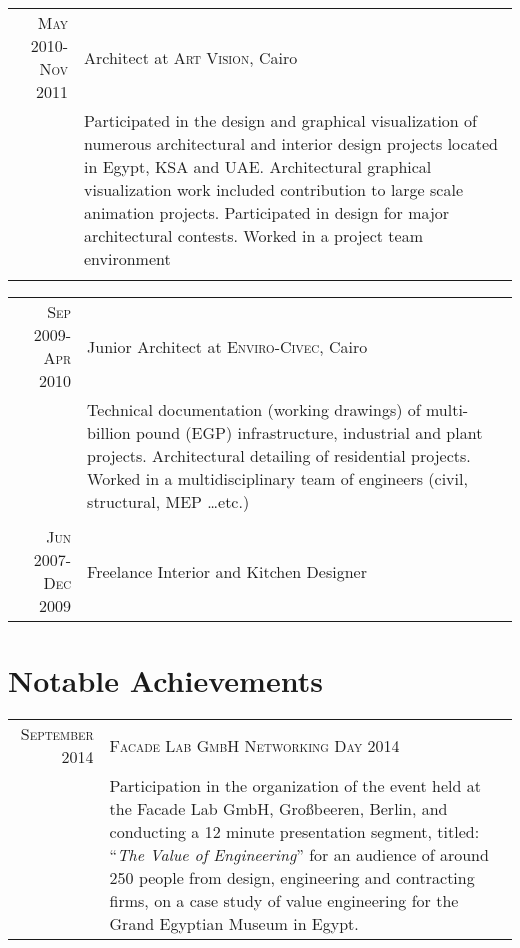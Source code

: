 \documentclass[a4paper,11pt]{article} %
\begin{document}
\begin{tabular}{r|p{11cm}}

\textsc{May 2010-Nov 2011} & Architect at \textsc{Art Vision}, Cairo \emph{}\\
& \footnotesize{Participated in the design and graphical visualization of numerous architectural and interior design projects located in Egypt, KSA and UAE. Architectural graphical visualization work included contribution to large scale animation projects. Participated in design for major architectural contests. Worked in a project team environment}\\
\multicolumn{2}{c}{} \\
\end{tabular}


\newpage

\begin{tabular}{r|p{11cm}}
\textsc{Sep 2009-Apr 2010} & Junior Architect at \textsc{Enviro-Civec}, Cairo \emph{}\\
& \footnotesize{Technical documentation (working drawings) of multi-billion pound (EGP) infrastructure, industrial and plant projects. Architectural detailing of residential projects. Worked in a multidisciplinary team of engineers (civil, structural, MEP \ldots{}etc.)}\\
\multicolumn{2}{c}{} \\


\textsc{Jun 2007-Dec 2009} & Freelance Interior and Kitchen Designer\\
\end{tabular}

\vspace{0.5cm}


\section{Notable Achievements}

\begin{tabular}{r|p{11cm}}
\textsc{September 2014} & \textsc{Facade Lab GmbH Networking Day 2014}\\ 
& \footnotesize{Participation in the organization of the event held at the Facade Lab GmbH, Gro\ss beeren, Berlin, and conducting a 12 minute presentation segment, titled: ``\emph{The Value of Engineering}'' for an audience of around 250 people from design, engineering and contracting firms, on a case study of value engineering for the Grand Egyptian Museum in Egypt.}\\
\end{tabular}
\end{document}
